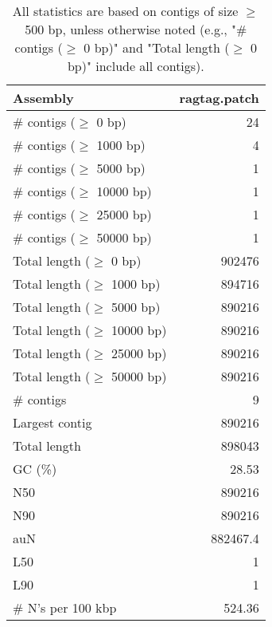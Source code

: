 \documentclass[12pt,a4paper]{article}
\begin{document}
\begin{table}[ht]
\begin{center}
\caption{All statistics are based on contigs of size $\geq$ 500 bp, unless otherwise noted (e.g., "\# contigs ($\geq$ 0 bp)" and "Total length ($\geq$ 0 bp)" include all contigs).}
\begin{tabular}{|l*{1}{|r}|}
\hline
Assembly & ragtag.patch \\ \hline
\# contigs ($\geq$ 0 bp) & 24 \\ \hline
\# contigs ($\geq$ 1000 bp) & 4 \\ \hline
\# contigs ($\geq$ 5000 bp) & 1 \\ \hline
\# contigs ($\geq$ 10000 bp) & 1 \\ \hline
\# contigs ($\geq$ 25000 bp) & 1 \\ \hline
\# contigs ($\geq$ 50000 bp) & 1 \\ \hline
Total length ($\geq$ 0 bp) & 902476 \\ \hline
Total length ($\geq$ 1000 bp) & 894716 \\ \hline
Total length ($\geq$ 5000 bp) & 890216 \\ \hline
Total length ($\geq$ 10000 bp) & 890216 \\ \hline
Total length ($\geq$ 25000 bp) & 890216 \\ \hline
Total length ($\geq$ 50000 bp) & 890216 \\ \hline
\# contigs & 9 \\ \hline
Largest contig & 890216 \\ \hline
Total length & 898043 \\ \hline
GC (\%) & 28.53 \\ \hline
N50 & 890216 \\ \hline
N90 & 890216 \\ \hline
auN & 882467.4 \\ \hline
L50 & 1 \\ \hline
L90 & 1 \\ \hline
\# N's per 100 kbp & 524.36 \\ \hline
\end{tabular}
\end{center}
\end{table}
\end{document}
